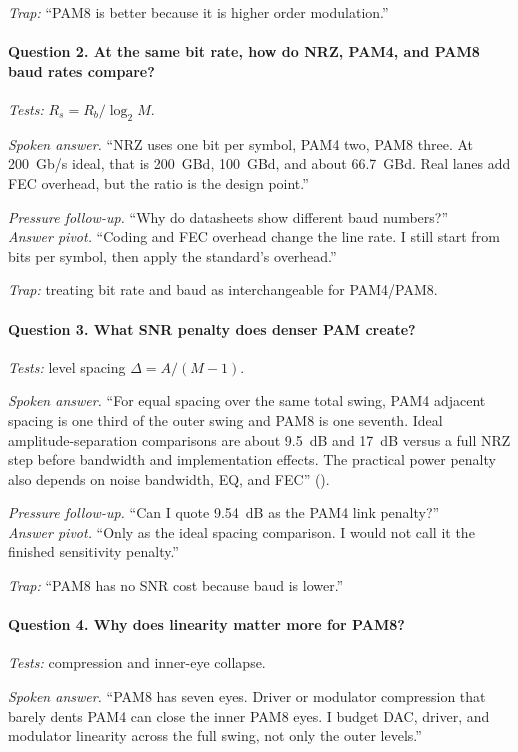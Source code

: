 \textit{Trap:} ``PAM8 is better because it is higher order modulation.''

\paragraph{Question 2. At the same bit rate, how do NRZ, PAM4, and PAM8 baud
rates compare?}
\textit{Tests:} \(R_s=R_b/\log_2 M\).

\textit{Spoken answer.}
``NRZ uses one bit per symbol, PAM4 two, PAM8 three. At 200~Gb/s ideal, that is
200~GBd, 100~GBd, and about 66.7~GBd. Real lanes add FEC overhead, but the ratio
is the design point.''

\textit{Pressure follow-up.} ``Why do datasheets show different baud numbers?''\\
\textit{Answer pivot.} ``Coding and FEC overhead change the line rate. I still
start from bits per symbol, then apply the standard's overhead.''

\textit{Trap:} treating bit rate and baud as interchangeable for PAM4/PAM8.

\paragraph{Question 3. What SNR penalty does denser PAM create?}
\textit{Tests:} level spacing \(\Delta=A/(M-1)\).

\textit{Spoken answer.}
``For equal spacing over the same total swing, PAM4 adjacent spacing is one
third of the outer swing and PAM8 is one seventh. Ideal amplitude-separation
comparisons are about 9.5~dB and 17~dB versus a full NRZ step before bandwidth
and implementation effects. The practical power penalty also depends on noise
bandwidth, EQ, and FEC'' ().

\textit{Pressure follow-up.} ``Can I quote 9.54~dB as the PAM4 link penalty?''\\
\textit{Answer pivot.} ``Only as the ideal spacing comparison. I would not call
it the finished sensitivity penalty.''

\textit{Trap:} ``PAM8 has no SNR cost because baud is lower.''

\paragraph{Question 4. Why does linearity matter more for PAM8?}
\textit{Tests:} compression and inner-eye collapse.

\textit{Spoken answer.}
``PAM8 has seven eyes. Driver or modulator compression that barely dents PAM4
can close the inner PAM8 eyes. I budget DAC, driver, and modulator linearity
across the full swing, not only the outer levels.''

